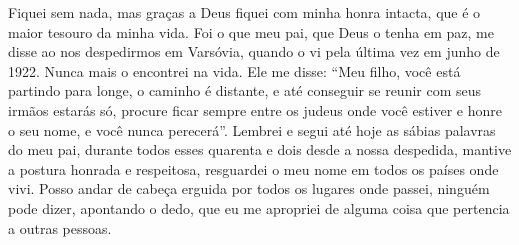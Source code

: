 Fiquei sem nada, mas graças a Deus fiquei com minha honra intacta, que é
o maior tesouro da minha vida. Foi o que meu pai, que Deus o tenha em
paz, me disse ao nos despedirmos em Varsóvia, quando o vi pela última
vez em junho de 1922. Nunca mais o encontrei na vida. Ele me disse:
``Meu filho, você está partindo para longe, o caminho é distante, e até
conseguir se reunir com seus irmãos estarás só, procure ficar sempre
entre os judeus onde você estiver e honre o seu nome, e você nunca
perecerá''. Lembrei e segui até hoje as sábias palavras do meu pai,
durante todos esses quarenta e dois desde a nossa despedida, mantive a
postura honrada e respeitosa, resguardei o meu nome em todos os países
onde vivi. Posso andar de cabeça erguida por todos os lugares onde
passei, ninguém pode dizer, apontando o dedo, que eu me apropriei de
alguma coisa que pertencia a outras pessoas.
